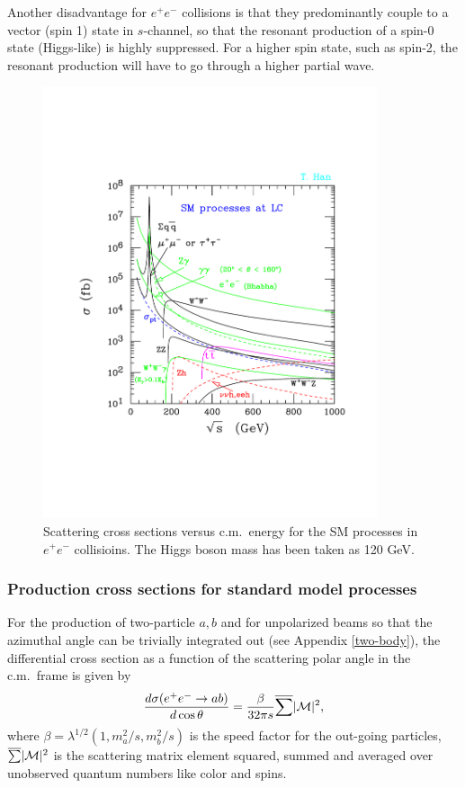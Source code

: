 \documentclass[12pt,prd,aps,floats,preprintnumbers,preprint,superscriptaddress,floatfix,nofootinbib]{revtex4}
\def\cM{{\cal M}}
\def\epem{e^+e^-}
\def\bea{\begin{eqnarray}}
\def\eea{\end{eqnarray}}
\begin{document}
Another disadvantage for $\epem$ collisions is that they predominantly couple
to a vector (spin 1) state in $s$-channel, so that the resonant production
of a spin-0 state (Higgs-like) is highly suppressed.  For a higher spin state,
such as spin-2, the resonant production will have to go through a higher
partial wave. 

\begin{figure}[tb]
\includegraphics[height=5in]{epem_sm-hepph.pdf}
\caption{Scattering cross sections versus c.m.~energy for the SM processes in $e^+e^-$
collisioins. The Higgs boson mass has been taken as 120 GeV.}
\label{fig:epem}
\end{figure}

\subsubsection{Production cross sections for standard model processes}
 
For the production of  two-particle $a,b$ and for unpolarized beams so that the
azimuthal angle can be trivially integrated out  (see Appendix \ref{two-body}),
the differential cross section as a function of the scattering polar angle in the
c.m.~frame is given by
\bea
{d\sigma(e^+e^-\to ab) \over d\cos\theta} = \frac{\beta}{32\pi s}  
\overline{ \sum} |\cM|^2 ,
\label{dsdc}
\eea
where $\beta=\lambda^{1/2}(1, m_a^2/s, m_b^2/s)$ is the speed factor
for the out-going particles,  $\overline{\sum}|\cM|^2$ is 
the scattering matrix element squared, 
summed and averaged over unobserved quantum numbers
like color and spins. 
\end{document}
